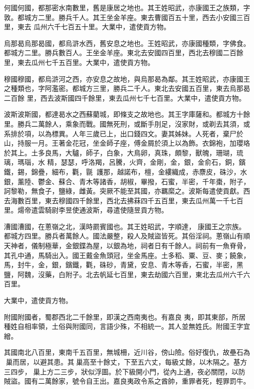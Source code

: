 \begin{pinyinscope}
 何國何國，都那密水南數里，舊是康居之地也。其王姓昭武，亦康國王之族類，字敦。都城方二里。勝兵千人。其王坐金羊座。東去曹國百五十里，西去小安國三百里，東去
 瓜州六千七百五十里。大業中，遣使貢方物。



 烏那曷烏那曷國，都烏滸水西，舊安息之地也。王姓昭武，亦康國種類，字佛食。都城方二里。勝兵數百人。王坐金羊座。東北去安國四百里，西北去穆國二百餘里，東去瓜州七千五百里。大業中，遣使貢方物。



 穆國穆國，都烏滸河之西，亦安息之故地，與烏那曷為鄰。其王姓昭武，亦康國王之種類也，字阿濫密。都城方三里，勝兵二千人。東北去安國五百里，東去烏那曷二百餘
 里，西去波斯國四千餘里，東去瓜州七千七百里。大業中，遣使貢方物。



 波斯波斯國，都達曷水之西蘇藺城，即條支之故地也。其王字庫薩和。都城方十餘里。勝兵二萬餘人，乘象而戰。國無死刑，或斷手刖足，沒家財，或剃去其須，或系排於項，以為標異。人年三歲已上，出口錢四文。妻其姊妹。人死者，棄尸於山，持服一月。王著金花冠，坐金師子座，傅金屑於須上以為飾。衣錦袍，加瓔珞於其上。土多良馬，大驢，師子，白象，大鳥卵，真珠，頗黎，獸魄，珊瑚，琉璃，瑪瑙，水
 精，瑟瑟，呼洛羯，呂騰，火齊，金剛，金，銀，金俞石，銅，鑌鐵，錫，錦疊，細布，氍，毾，護那，越諾布，檀，金縷織成，赤麖皮，硃沙，水銀，薰陸、鬱金、蘇合、青木等諸香，胡椒，畢撥，石蜜，半密，千年棗，附子，訶黎勒，無食子，鹽綠，雌黃。突厥不能至其國，亦羈縻之。波斯每遣使貢獻。西去海數百里，東去穆國四千餘里，西北去拂菻四千五百里，東去瓜州萬一千七百里。煬帝遣雲騎尉李昱使通波斯，尋遣使隨昱貢方物。



 漕國漕國，在蔥嶺之北，漢時罽賓國也。其王姓昭武，字順達，
 康國王之宗族。都城方四里。勝兵者萬餘人。國法嚴整，殺人及賊盜皆死。其俗淫祠。蔥嶺山有順天神者，儀制極華，金銀鍱為屋，以銀為地，祠者日有千餘人。祠前有一魚脊骨，其孔中通，馬騎出入。國王戴金魚頭冠，坐金馬座。土多稻、粟、豆、麥；饒象，馬，封牛，金，銀，鑌鐵，氍，硃砂，青黛，安息、青木等香，石蜜，半密，黑鹽，阿魏，沒藥，白附子。北去帆延七百里，東去劫國六百里，東北去瓜州六千六百里。



 大業中，遣使貢方物。



 附國附國者，蜀郡西北二千餘里，即漢之西南夷也。有嘉良
 夷，即其東部，所居種姓自相率領，土俗與附國同，言語少殊，不相統一。其人並無姓氏。附國王字宜繒。



 其國南北八百里，東南千五百里，無城柵，近川谷，傍山險。俗好復仇，故壘石為巢而居，以避其患。其巢高至十餘丈，下至五六丈，每級丈餘，以木隔之。基方三四步，巢上方二三步，狀似浮圖。於下級開小門，從內上通，夜必關閉，以防賊盜。國有二萬餘家，號令自王出。嘉良夷政令系之酋帥，重罪者死，輕罪罰牛。




\end{pinyinscope}
